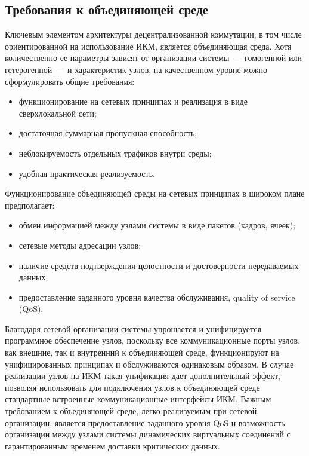 \begin{multicols}{2}
\vspace*{-6pt}

\section{Требования к объединяющей среде}

\vspace*{-3pt}
     
     Ключевым элементом архитектуры децентрализованной коммутации, в том числе 
ориентированной на использование ИКМ, является объединяющая среда. Хотя 
количественно ее параметры зависят от организации системы~--- гомогенной или 
гетерогенной~--- и характеристик узлов, на качественном уровне можно сформулировать 
общие требования:
     \begin{itemize}
\item функционирование на сетевых принципах и реализация в виде сверхлокальной сети;
\item достаточная суммарная пропускная способность;
\item неблокируемость отдельных трафиков внутри среды;
\item удобная практическая реализуемость.
\end{itemize}

     Функционирование объединяющей среды на сетевых принципах в широком плане 
предполагает:
     \begin{itemize}
\item обмен информацией между узлами системы в виде пакетов (кадров, ячеек);
\item сетевые методы адресации узлов;
\item наличие средств подтверждения целостности и достоверности передаваемых данных;
\item предоставление заданного уровня качества обслуживания, quality of service (QoS).
\end{itemize}

     Благодаря сетевой организации системы упрощается и унифицируется программное 
обеспечение узлов, поскольку все коммуникационные порты узлов, как внешние, так и 
внутренний к объединя\-ющей среде, функционируют на унифицированных принципах и 
обслуживаются одинаковым образом. В случае реализации узлов на ИКМ такая унификация 
дает дополнительный эффект, позволяя использовать для подключения узлов к 
объединяющей среде стандартные встроенные коммуникационные интерфейсы ИКМ. 
Важным требованием к объединяющей среде, легко реализуемым при сетевой организации, 
является предоставление заданного уровня QoS и возможность организации между узлами 
системы динамических виртуальных соединений с гарантированным временем доставки 
критических данных.
     

\end{multicols}
